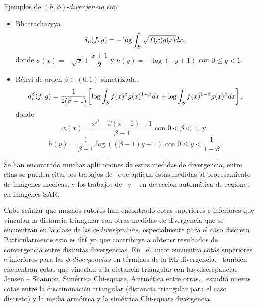 \begin{example} Ejemplos de $\left(h,\phi\right) \text{-} divergencia$ son:
	\begin{itemize}
		\item Bhattacharyya 
		\begin{align}
		\label{Bhattacharyya}
		d_{\text{\tiny{B}}}(f,g)=-\log \displaystyle \int_{S} \sqrt{f(x) g(x)} dx,
		\end{align}
		donde $\phi(x)=-\sqrt{x}+\dfrac{x+1}{2}$ y $h(y)=-\log(-y+1)$ con $0\leq y<1$.
		\item R\'enyi de orden $\beta\in(0,1)$ simetrizada.
		\begin{align}
		d_\text{\tiny{R}}^{\beta}(f,g)=\frac{1}{2(\beta-1)}\left[\log\int_{S}{f(x)^{\beta}g(x)^{1-\beta} dx+\log\int_{S}f(x)^{1-\beta}g(x)^{\beta}} dx\right],
		\end{align}
		donde 
		$$\phi(x)=\dfrac{x^{\beta}-\beta(x-1)-1}{\beta-1} \text{ con } 0 < \beta < 1, \text{ y }$$  
		$$h(y)=\dfrac{1}{\beta-1}\log((\beta-1)y+1) \text{ con } 0\leq y<\dfrac{1}{1-\beta}.$$
	\end{itemize}
\end{example}

Se han encontrado muchas aplicaciones de estas medidas de divergencia, entre ellas se pueden citar los trabajos de~\citet{Aviyente2007} que aplican estas medidas al procesamiento de imágenes medicas, y los trabajos de~\citet{ClassificationPolSARSegmentsMinimizationWishartDistances} y ~\citet{EdgeDetectionDistancesEntropiesJSTARS} en detección automática de regiones en imágenes SAR. 

Cabe señalar que muchos autores han encontrado cotas superiores e inferiores que vinculan la distancia triangular con otras medidas de divergencia que se encuentran en la clase de las $\phi \text{-} divergencias$, especialmente para el caso discreto. Particularmente esto es útil ya que contribuye a obtener resultados de convergencia entre distintas divergencias. En~\citet{Dragomir2002} el autor encuentra cotas superiores e inferiores para las $\phi \text{-} divergencias$ en términos de la KL divergencia.~\citet{JainSrivastava2007} también encuentran cotas que vinculan a la distancia triangular con las discrepancias Jensen – Shannon, Simétrica Chi-square, Aritmética entre otras.~\citet{Taneja2006} estudió nuevas cotas entre la discriminación triangular (distancia triangular para el caso discreto) y la media armónica y la simétrica Chi-square divergencia.

